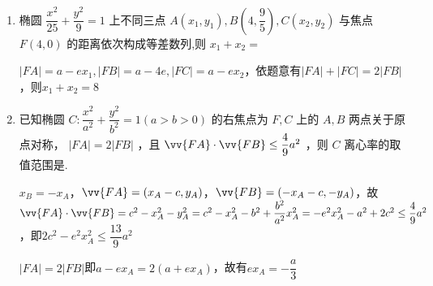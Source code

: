 \begin{enumerate}
    \item 椭圆 $\dfrac{{x}^{2}}{25} + \dfrac{{y}^{2}}{9} = 1$ 上不同三点 $A\left( {{x}_{1},{y}_{1}}\right) ,B\left( {4,\dfrac{9}{5}}\right) ,C\left( {{x}_{2},{y}_{2}}\right)$ 与焦点 $F\left( {4,0}\right)$ 的距离依次构成等差数列,则 ${x}_{1} + {x}_{2} =$
    \begin{jieda}
        $|FA| = a-ex_1, |FB| = a-4e, |FC| = a-ex_2$，依题意有$|FA|+|FC| = 2|FB|$，则$x_1+x_2 = 8$
    \end{jieda}
    \item 已知椭圆 $C : \dfrac{{x}^{2}}{{a}^{2}} + \dfrac{{y}^{2}}{{b}^{2}} = 1\left( {a > b > 0}\right)$ 的右焦点为 $F,C$ 上的 $A,B$ 两点关于原点对称， $\left| {FA}\right|  = 2\left| {FB}\right|$ ，且 $\vv{FA} \cdot  \vv{FB} \leq  \dfrac{4}{9}{a}^{2}$ ，则 $C$ 离心率的取值范围是.
    \begin{jieda}
        $x_B =-x_A$，$\vv{FA} = (x_A - c, y_A)$，$\vv{FB} = (-x_A - c, -y_A)$，故$\vv{FA} \cdot  \vv{FB} = c^2-x_A^2 - y_A^2 = c^2 - x_A^2 - b^2 + \dfrac{b^2}{a^2}x_A^2 = -e^2x_A^2 - a^2 +2c^2 \leq  \dfrac{4}{9}{a}^{2}$，即$2c^2-e^2x_A^2 \leq \dfrac{13}{9}a^2$
        
        $\left| {FA}\right|  = 2\left| {FB}\right|$即$a - ex_A = 2(a+ex_A)$，故有$ex_A = -\dfrac{a}{3}$

        
    \end{jieda}
    

\end{enumerate}
